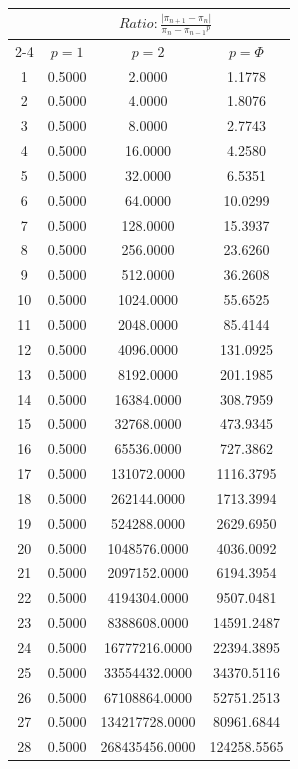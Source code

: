 \documentclass{article}
\providecommand{\abs}[1]{\lvert#1\rvert}
\begin{document}
\begin{tabular}{|c|c|c|c|}
\hline
\n & \multicolumn{3}{|c|}{$Ratio:\displaystyle\frac{\abs{\pi_{n+1}-\pi_{n}}}{{\pi_{n}-\pi_{n-1}}^p}$} \\
\cline{2-4}
 & $p=1$ & $p=2$ & $p=\Phi$ \\
\hline
 1 & 0.5000 & 2.0000 & 1.1778 \\ 
  2 & 0.5000 & 4.0000 & 1.8076 \\ 
  3 & 0.5000 & 8.0000 & 2.7743 \\ 
  4 & 0.5000 & 16.0000 & 4.2580 \\ 
  5 & 0.5000 & 32.0000 & 6.5351 \\ 
  6 & 0.5000 & 64.0000 & 10.0299 \\ 
  7 & 0.5000 & 128.0000 & 15.3937 \\ 
  8 & 0.5000 & 256.0000 & 23.6260 \\ 
  9 & 0.5000 & 512.0000 & 36.2608 \\ 
 10 & 0.5000 & 1024.0000 & 55.6525 \\ 
 11 & 0.5000 & 2048.0000 & 85.4144 \\ 
 12 & 0.5000 & 4096.0000 & 131.0925 \\ 
 13 & 0.5000 & 8192.0000 & 201.1985 \\ 
 14 & 0.5000 & 16384.0000 & 308.7959 \\ 
 15 & 0.5000 & 32768.0000 & 473.9345 \\ 
 16 & 0.5000 & 65536.0000 & 727.3862 \\ 
 17 & 0.5000 & 131072.0000 & 1116.3795 \\ 
 18 & 0.5000 & 262144.0000 & 1713.3994 \\ 
 19 & 0.5000 & 524288.0000 & 2629.6950 \\ 
 20 & 0.5000 & 1048576.0000 & 4036.0092 \\ 
 21 & 0.5000 & 2097152.0000 & 6194.3954 \\ 
 22 & 0.5000 & 4194304.0000 & 9507.0481 \\ 
 23 & 0.5000 & 8388608.0000 & 14591.2487 \\ 
 24 & 0.5000 & 16777216.0000 & 22394.3895 \\ 
 25 & 0.5000 & 33554432.0000 & 34370.5116 \\ 
 26 & 0.5000 & 67108864.0000 & 52751.2513 \\ 
 27 & 0.5000 & 134217728.0000 & 80961.6844 \\ 
 28 & 0.5000 & 268435456.0000 & 124258.5565 \\ 
 \hline 
\end{tabular}
\end{document}
